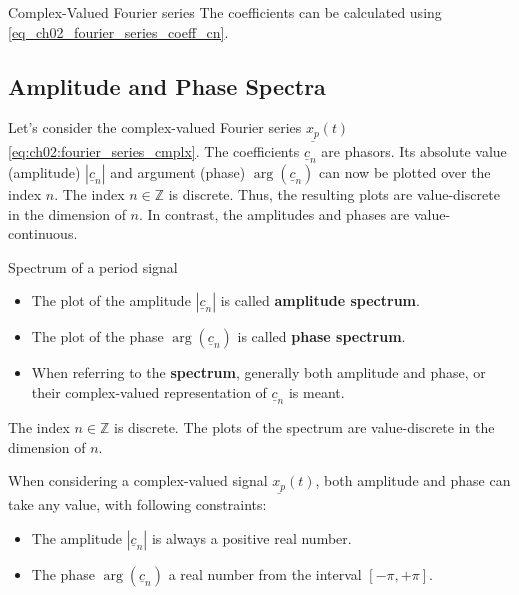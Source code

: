 \begin{refsection}
\begin{definition}{Complex-Valued Fourier series}
	The coefficients can be calculated using \eqref{eq_ch02_fourier_series_coeff_cn}.
\end{definition}

\subsection{Amplitude and Phase Spectra}

Let's consider the complex-valued Fourier series $\underline{x_p}(t)$ \eqref{eq:ch02:fourier_series_cmplx}. The coefficients $\underline{c}_n$ are phasors. Its absolute value (amplitude) $|\underline{c}_n|$ and argument (phase) $\arg\left(\underline{c}_n\right)$ can now be plotted over the index $n$. The index $n \in \mathbb{Z}$ is discrete. Thus, the resulting plots are value-discrete in the dimension of $n$. In contrast, the amplitudes and phases are value-continuous.

\begin{definition}{Spectrum of a period signal}
	\begin{itemize}
		\item The plot of the amplitude $|\underline{c}_n|$ is called  \textbf{amplitude spectrum}.
		\item The plot of the phase $\arg\left(\underline{c}_n\right)$ is called  \textbf{phase spectrum}.
		\item When referring to the  \textbf{spectrum}, generally both amplitude and phase, or their complex-valued representation of $\underline{c}_n$ is meant.
	\end{itemize}
\end{definition}

\begin{fact}
	The index $n \in \mathbb{Z}$ is discrete. The plots of the spectrum are value-discrete in the dimension of $n$.
\end{fact}

When considering a complex-valued signal $\underline{x_p}(t)$, both amplitude and phase can take any value, with following constraints:
\begin{itemize}
	\item The amplitude $|\underline{c}_n|$ is always a positive real number.
	\item The phase $\arg\left(\underline{c}_n\right)$ a real number from the interval $[-\pi, +\pi]$.
\end{itemize}


\end{refsection}

